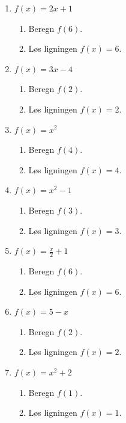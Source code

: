 \documentclass[10pt,a4paper,table]{article}
\begin{document}
\begin{enumerate}
    \item $f(x) = 2x + 1$
    \begin{enumerate}
        \item Beregn $f(6)$.
        \item Løs ligningen $f(x)=6$.
    \end{enumerate}

    \item $f(x) = 3x - 4$
    \begin{enumerate}
        \item Beregn $f(2)$.
        \item Løs ligningen $f(x)=2$.
    \end{enumerate}

    \item $f(x) = x^2$
    \begin{enumerate}
        \item Beregn $f(4)$.
        \item Løs ligningen $f(x)=4$.
    \end{enumerate}

    \item $f(x) = x^2 - 1$
    \begin{enumerate}
        \item Beregn $f(3)$.
        \item Løs ligningen $f(x)=3$.
    \end{enumerate}

    \item $f(x) = \frac{x}{2} + 1$
    \begin{enumerate}
        \item Beregn $f(6)$.
        \item Løs ligningen $f(x)=6$.
    \end{enumerate}

    \item $f(x) = 5 - x$
    \begin{enumerate}
        \item Beregn $f(2)$.
        \item Løs ligningen $f(x)=2$.
    \end{enumerate}

    \item $f(x) = x^2 + 2$
    \begin{enumerate}
        \item Beregn $f(1)$.
        \item Løs ligningen $f(x)=1$.
    \end{enumerate}


\end{enumerate}
\end{document}

